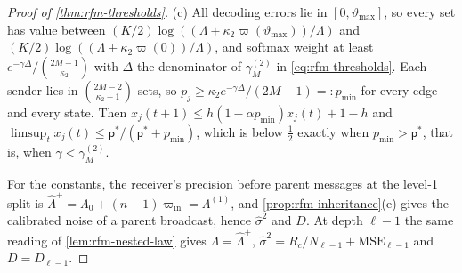 \begin{proof}[Proof of \cref{thm:rfm-thresholds}]
(c) All decoding errors lie in $[0,\vartheta_{\max}]$, so every set has value between $(K/2)\log((\Lambda+\kappa_2\varpi(\vartheta_{\max}))/\Lambda)$ and $(K/2)\log((\Lambda+\kappa_2\varpi(0))/\Lambda)$, and softmax weight at least $e^{-\gamma\Delta}/\binom{2M-1}{\kappa_2}$ with $\Delta$ the denominator of $\gamma_M^{(2)}$ in \eqref{eq:rfm-thresholds}. Each sender lies in $\binom{2M-2}{\kappa_2-1}$ sets, so $p_j\ge\kappa_2e^{-\gamma\Delta}/(2M-1)=:p_{\min}$ for every edge and every state. Then $x_j(t+1)\le h(1-\alpha p_{\min})x_j(t)+1-h$ and $\limsup_tx_j(t)\le\mathsf p^\ast/(\mathsf p^\ast+p_{\min})$, which is below $\frac12$ exactly when $p_{\min}>\mathsf p^\ast$, that is, when $\gamma<\gamma_M^{(2)}$.

For the constants, the receiver's precision before parent messages at the level-1 split is $\hat\Lambda^+=\Lambda_0+(n-1)\varpi_{\mathrm{in}}=\Lambda^{(1)}$, and \cref{prop:rfm-inheritance}(e) gives the calibrated noise of a parent broadcast, hence $\hat\sigma^2$ and $D$. At depth $\ell-1$ the same reading of \cref{lem:rfm-nested-law} gives $\Lambda=\hat\Lambda^+$, $\hat\sigma^2=R_c/N_{\ell-1}+\mathrm{MSE}_{\ell-1}$ and $D=D_{\ell-1}$.
\end{proof}

